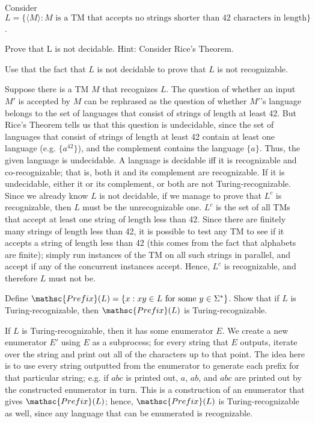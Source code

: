 \documentclass[solution, letterpaper]{cs121}
\begin{document}
\subproblem Consider $L = \{\langle M \rangle: M \text{ is a TM that accepts no strings shorter than } 42 \text{ characters in length}\}$. 
 
Prove that L is not decidable. Hint: Consider Rice's Theorem.

\subproblem Use that the fact that $L$ is not decidable to prove that $L$ is not recognizable.

\begin{solution}
\subsolution Suppose there is a TM $M$ that recognizes $L$.  The question of whether an input $M'$ is accepted by $M$ can be rephrased as the question of whether $M'$'s language belongs to the set of languages that consist of strings of length at least 42.  But Rice's Theorem tells us that this question is undecidable, since the set of languages that consist of strings of length at least 42 contain at least one language (e.g. $\{a^42\}$), and the complement contains the language $\{a\}$.  Thus, the given language is undecidable.
\subsolution A language is decidable iff it is recognizable and co-recognizable; that is, both it and its complement are recognizable.  If it is undecidable, either it or its complement, or both are not Turing-recognizable.  Since we already know $L$ is not decidable, if we manage to prove that $L^c$ is recognizable, then $L$ must be the unrecognizable one.  $L^c$ is the set of all TMs that accept at least one string of length less than 42.  Since there are finitely many strings of length less than 42, it is possible to test any TM to see if it accepts a string of length less than 42 (this comes from the fact that alphabets are finite); simply run instances of the TM on all such strings in parallel, and accept if any of the concurrent instances accept.  Hence, $L^c$ is recognizable, and therefore $L$ must not be.
\end{solution}


Define $\mathsc{Prefix}(L) = \{ x : xy \in L \text{ for some }y \in \Sigma^*\}$. Show that if $L$ is Turing-recognizable, then $\mathsc{Prefix}(L)$ is Turing-recognizable.

\begin{solution}
If $L$ is Turing-recognizable, then it has some enumerator $E$.  We create a new enumerator $E'$ using $E$ as a subprocess; for every string that $E$ outputs, iterate over the string and print out all of the characters up to that point.  The idea here is to use every string outputted from the enumerator to generate each prefix for that particular string; e.g. if $abc$ is printed out, $a$, $ab$, and $abc$ are printed out by the constructed enumerator in turn.  This is a construction of an enumerator that gives $\mathsc{Prefix}(L)$; hence, $\mathsc{Prefix}(L)$ is Turing-recognizable as well, since any language that can be enumerated is recognizable.
\end{solution}
\end{document}

